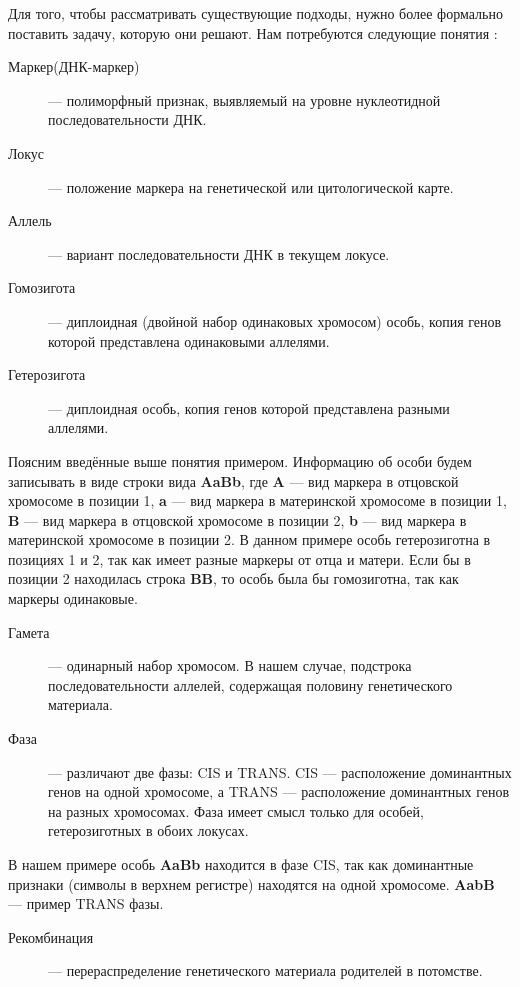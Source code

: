 \documentclass{matmex-diploma-custom}
\begin{document}
Для того, чтобы рассматривать существующие подходы, нужно более
формально поставить задачу, которую они решают. Нам потребуются
следующие понятия \cite{dictionary}:
\begin{description}
\item[Маркер(ДНК-маркер)] --- полиморфный признак, выявляемый на
  уровне нуклеотидной последовательности ДНК.
\item[Локус] --- положение маркера на генетической или цитологической
  карте.
\item[Аллель] --- вариант последовательности ДНК в текущем локусе.
\item[Гомозигота] --- диплоидная (двойной набор одинаковых хромосом)
  особь, копия генов которой представлена одинаковыми аллелями.
\item[Гетерозигота] --- диплоидная особь, копия генов которой
  представлена разными аллелями.
\end{description}

Поясним введённые выше понятия примером. Информацию об особи будем
записывать в виде строки вида \textbf{AaBb}, где \textbf{A} --- вид
маркера в отцовской хромосоме в позиции 1, \textbf{a} --- вид маркера
в материнской хромосоме в позиции 1, \textbf{B} --- вид маркера в
отцовской хромосоме в позиции 2, \textbf{b} --- вид маркера в
материнской хромосоме в позиции 2. В данном примере особь
гетерозиготна в позициях 1 и 2, так как имеет разные маркеры от отца и
матери. Если бы в позиции 2 находилась строка \textbf{BB}, то особь
была бы гомозиготна, так как маркеры одинаковые.

\begin{description}
\item[Гамета] --- одинарный набор хромосом. В нашем случае,
  подстрока последовательности аллелей, содержащая половину
  генетического материала.

\item[Фаза] --- различают две фазы: CIS и TRANS. CIS --- расположение
  доминантных генов на одной хромосоме, а TRANS --- расположение
  доминантных генов на разных хромосомах. Фаза имеет смысл только для
  особей, гетерозиготных в обоих локусах.
\end{description}

В нашем примере особь \textbf{AaBb} находится в фазе CIS, так как
доминантные признаки (символы в верхнем регистре) находятся на одной
хромосоме. \textbf{AabB} --- пример TRANS фазы.

\begin{description}
\item[Рекомбинация] --- перераспределение генетического материала
  родителей в потомстве.
\end{description}
\end{document}
